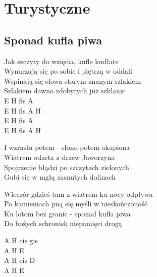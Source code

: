 \documentclass{report}
\begin{document}
\newenvironment{chorus}{\begin{adjustwidth}{2cm}{}}{\end{adjustwidth}}


\renewcommand{\contentsname}{Spis treści}
\tableofcontents
\chapter*{Turystyczne}
\section*{Sponad kufla piwa}
\begin{paracol}{2}
Jak szczyty do wzięcia, kufle kudłate\\
Wynurzają się po sobie i piętrzą w oddali\\
Wspinają się słowa starym znanym szlakiem\\
Szlakiem dawno zdobytych już szklanic\\

\switchcolumn
E H fis A\\
E H fis A H\\
E H fis A\\
E H fis A H\\

\end{paracol}
\begin{paracol}{2}
I wzrasta potem - słono potem okupiona\\
Wiatrem odarta z drzew Jaworzyna\\
Spojrzenie błądzi po szczytach zielonych\\
Gubi się w mgłą zasnutych dolinach\\

\switchcolumn

\end{paracol}
\begin{paracol}{2}
\begin{chorus}
Wieczór gdzieś tam z wiatrem ku nocy odpływa\\
Po kamieniach pną się myśli w nieskończoność\\
Ku lotom bez granic - sponad kufla piwa\\
Do bożych schronisk niepamięci drogą\\
\end{chorus}

\switchcolumn
A H cis gis\\
A H E\\
A H cis D\\
A H E\\

\end{paracol}
\end{document}
